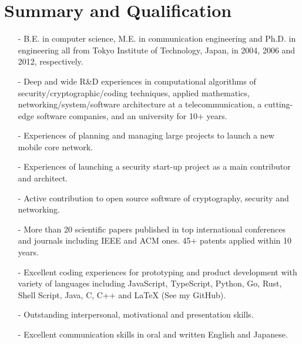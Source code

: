 \section*{Summary and Qualification}
\begin{itemize}
 \item[-] B.E. in computer science, M.E. in communication engineering and Ph.D. in engineering all from Tokyo Institute of Technology, Japan, in 2004, 2006 and 2012, respectively.
 \item[-] Deep and wide R\&D experiences in computational algorithms of security/cryptographic/coding techniques, applied mathematics, networking/system/software architecture at a telecommunication, a cutting-edge software companies, and an university for 10+ years.
 \item[-] Experiences of planning and managing large projects to launch a new mobile core network.
 \item[-] Experiences of launching a security start-up project as a main contributor and architect.
 \item[-] Active contribution to open source software of cryptography, security and networking.
 \item[-] More than 20 scientific papers published in top international conferences and journals including IEEE and ACM ones. 45+ patents applied within 10 years.
 \item[-] Excellent coding experiences for prototyping and product development with variety of languages including JavaScript, TypeScript, Python, Go, Rust, Shell Script, Java, C, C++ and LaTeX (See my GitHub).
 \item[-] Outstanding interpersonal, motivational and presentation skills.
 \item[-] Excellent communication skills in oral and written English and Japanese.
\end{itemize}
